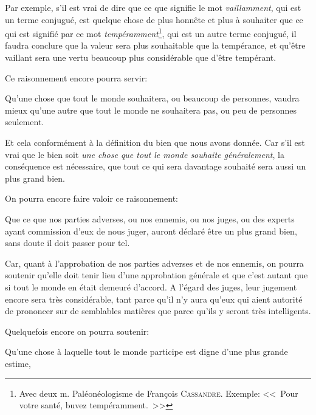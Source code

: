 Par exemple, s'il est vrai de dire que ce que signifie le mot \emph{vaillamment}, qui est un terme conjugué, est
quelque chose de plus honnête et plus à souhaiter que ce qui est signifié par ce mot \emph{tempéramment}\footnote{
Avec deux m. Paléonéologisme de François \textsc{Cassandre}. Exemple: <<~Pour votre santé, buvez tempéramment.~>>},
qui est un autre terme conjugué, il faudra conclure que la valeur sera plus souhaitable que la tempérance, et qu'être
vaillant sera une vertu beaucoup plus considérable que d'être tempérant.

\bigbreak

Ce raisonnement encore pourra servir:

\begin{lieu}
	Qu'une chose que tout le monde souhaitera, ou beaucoup de personnes, vaudra mieux qu'une autre que tout le monde ne
	souhaitera pas, ou peu de personnes seulement.
\end{lieu}

Et cela conformément à la définition du bien que nous avons donnée. Car s'il est vrai que le bien soit \emph{une chose
que tout le monde souhaite généralement}, la conséquence est nécessaire, que tout ce qui sera davantage souhaité sera
aussi un plus grand bien.

\bigbreak

On pourra encore faire valoir ce raisonnement:

\begin{lieu}
	Que ce que nos parties adverses, ou nos ennemis, ou nos juges, ou des experts ayant commission d'eux de nous juger,
	auront déclaré être un plus grand bien, sans doute il doit passer pour tel.
\end{lieu}

Car, quant à l'approbation de nos parties adverses et de nos ennemis, on pourra soutenir qu'elle doit tenir lieu d'une
approbation générale et que c'est autant que si tout le monde en était demeuré d'accord. A l'égard des juges, leur jugement
encore sera très considérable, tant parce qu'il n'y aura qu'eux qui aient autorité de prononcer sur de semblables matières
que parce qu'ils y seront très intelligents.

\bigbreak

Quelquefois encore on pourra soutenir:

\begin{lieu}
	Qu'une chose à laquelle tout le monde participe est digne d'une plus grande estime,
\end{lieu}

